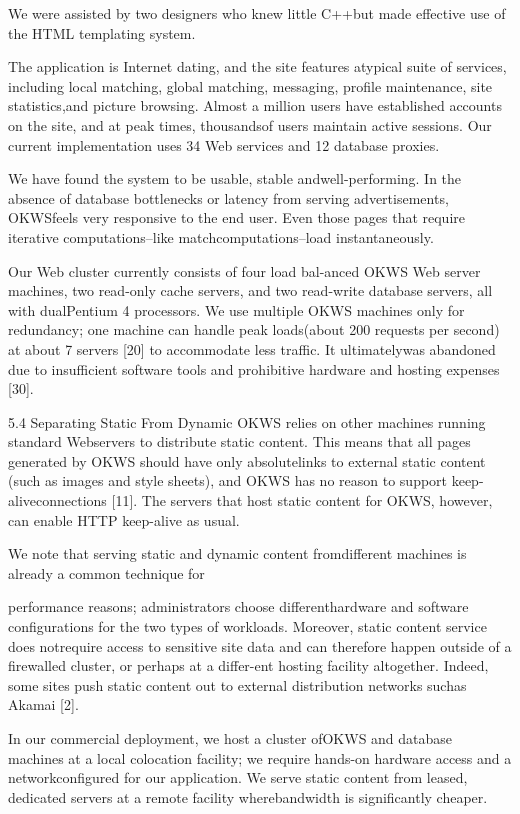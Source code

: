 We were assisted by two designers who knew little C++but made effective use of the HTML templating system.

The application is Internet dating, and the site features atypical suite of services, including local matching, global
matching, messaging, profile maintenance, site statistics,and picture browsing. Almost a million users have established accounts on the site, and at peak times, thousandsof users maintain active sessions. Our current implementation uses 34 Web services and 12 database proxies.

We have found the system to be usable, stable andwell-performing. In the absence of database bottlenecks or latency from serving advertisements, OKWSfeels very responsive to the end user. Even those
pages that require iterative computations--like matchcomputations--load instantaneously.

Our Web cluster currently consists of four load bal-anced OKWS Web server machines, two read-only cache
servers, and two read-write database servers, all with dualPentium 4 processors. We use multiple OKWS machines
only for redundancy; one machine can handle peak loads(about 200 requests per second) at about 7%
servers [20] to accommodate less traffic. It ultimatelywas abandoned due to insufficient software tools and prohibitive hardware and hosting expenses [30].

5.4 Separating Static From Dynamic
OKWS relies on other machines running standard Webservers to distribute static content. This means that all
pages generated by OKWS should have only absolutelinks to external static content (such as images and style
sheets), and OKWS has no reason to support keep-aliveconnections [11]. The servers that host static content for
OKWS, however, can enable HTTP keep-alive as usual.

We note that serving static and dynamic content fromdifferent machines is already a common technique for

performance reasons; administrators choose differenthardware and software configurations for the two types
of workloads. Moreover, static content service does notrequire access to sensitive site data and can therefore happen outside of a firewalled cluster, or perhaps at a differ-ent hosting facility altogether. Indeed, some sites push
static content out to external distribution networks suchas Akamai [2].

In our commercial deployment, we host a cluster ofOKWS and database machines at a local colocation facility; we require hands-on hardware access and a networkconfigured for our application. We serve static content
from leased, dedicated servers at a remote facility wherebandwidth is significantly cheaper.

